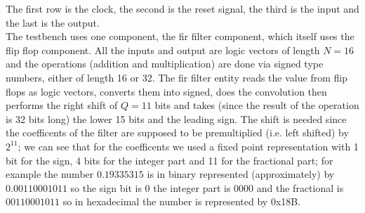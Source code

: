 \documentclass[a4paper,12pt]{report}
\begin{document}
The first row is the clock, the second is the reset signal, the third is the input and the last is the output.\\
The testbench uses one component, the fir filter component,
which itself uses the flip flop component. All the inputs and output are logic vectors of length $N=16$ and the operations (addition and multiplication) are done via signed type numbers, either of length 16 or 32. The fir filter entity reads the value from flip flops as logic vectors, converts them into signed, does the convolution then performs the right shift of $Q=11$ bits and takes (since the result of the operation is 32 bits long) the lower 15 bits and the leading sign. The shift is needed since the coefficents of the filter are supposed to be premultiplied (i.e. left shifted) by $2^{11}$; we can see that for the coefficents we used a fixed point representation with 1 bit for the sign, 4 bits for the integer part and 11 for the fractional part; for example the number $0.19335315$ is in binary represented (approximately) by $0.00110001011$ so the sign bit is $0$ the integer part is $0000$ and the fractional is $00110001011$ so in hexadecimal the number is represented by 0x18B.
\end{document}
